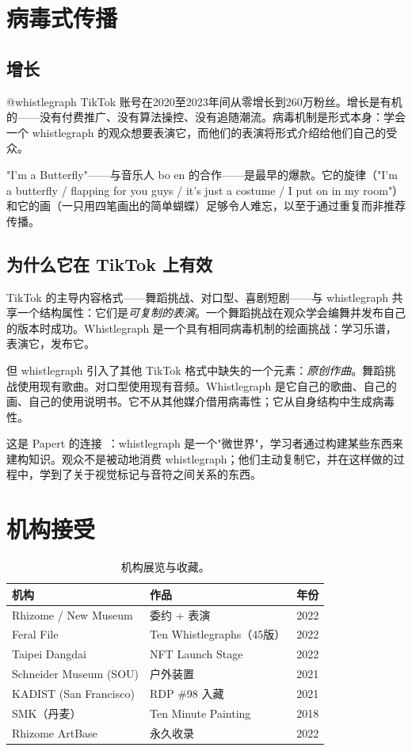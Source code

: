 \documentclass[10pt,letterpaper,twocolumn]{article}
\begin{document}
\section{病毒式传播}

\subsection{增长}

@whistlegraph TikTok 账号在2020至2023年间从零增长到260万粉丝。增长是有机的——没有付费推广、没有算法操控、没有追随潮流。病毒机制是形式本身：学会一个 whistlegraph 的观众想要表演它，而他们的表演将形式介绍给他们自己的受众。

"I'm a Butterfly"——与音乐人 bo en 的合作——是最早的爆款。它的旋律（"I'm a butterfly / flapping for you guys / it's just a costume / I put on in my room"）和它的画（一只用四笔画出的简单蝴蝶）足够令人难忘，以至于通过重复而非推荐传播。

\subsection{为什么它在 TikTok 上有效}

TikTok 的主导内容格式——舞蹈挑战、对口型、喜剧短剧——与 whistlegraph 共享一个结构属性：它们是\emph{可复制的表演}。一个舞蹈挑战在观众学会编舞并发布自己的版本时成功。Whistlegraph 是一个具有相同病毒机制的绘画挑战：学习乐谱，表演它，发布它。

但 whistlegraph 引入了其他 TikTok 格式中缺失的一个元素：\emph{原创作曲}。舞蹈挑战使用现有歌曲。对口型使用现有音频。Whistlegraph 是它自己的歌曲、自己的画、自己的使用说明书。它不从其他媒介借用病毒性；它从自身结构中生成病毒性。

这是 Papert 的连接~\citep{papert1980mindstorms}：whistlegraph 是一个"微世界"，学习者通过构建某些东西来建构知识。观众不是被动地消费 whistlegraph；他们主动复制它，并在这样做的过程中，学到了关于视觉标记与音符之间关系的东西。

\section{机构接受}

\begin{table}[h]
\small
\centering
\begin{tabularx}{\columnwidth}{Xlr}
\toprule
\textbf{机构} & \textbf{作品} & \textbf{年份} \\
\midrule
Rhizome / New Museum & 委约 + 表演 & 2022 \\
Feral File & Ten Whistlegraphs（45版） & 2022 \\
Taipei Dangdai & NFT Launch Stage & 2022 \\
Schneider Museum (SOU) & 户外装置 & 2021 \\
KADIST (San Francisco) & RDP \#98 入藏 & 2021 \\
SMK（丹麦） & Ten Minute Painting & 2018 \\
Rhizome ArtBase & 永久收录 & 2022 \\
\bottomrule
\end{tabularx}
\caption{机构展览与收藏。}
\label{tab:institutions}
\end{table}
\end{document}
